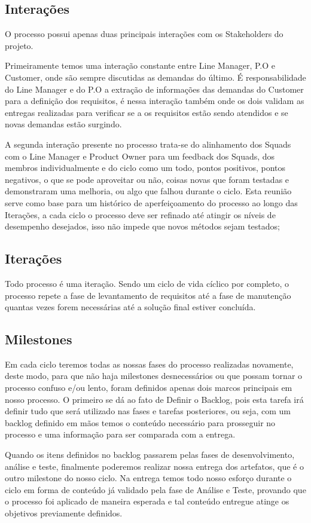 \documentclass[	DIV=calc,%
							paper=a4,%
							fontsize=12pt,%
							onecolumn]{scrartcl}	 					%
\begin{document}
\subsection{Interações}
O processo possui apenas duas principais interações com os Stakeholders do projeto. 

Primeiramente temos uma interação constante entre Line Manager, P.O e Customer, onde são sempre discutidas as demandas do último. É responsabilidade do Line Manager e do P.O a extração de informações das demandas do Customer para a definição dos requisitos, é nessa interação também onde os dois validam as entregas realizadas para verificar se a os requisitos estão sendo atendidos e se novas demandas estão surgindo. 

A segunda interação presente no processo trata-se do alinhamento dos Squads com o Line Manager e Product Owner para um feedback dos Squads, dos membros individualmente e do ciclo como um todo, pontos positivos, pontos negativos, o que se pode aproveitar ou não, coisas novas que foram testadas e demonstraram uma melhoria, ou algo que falhou durante o ciclo. Esta reunião serve como base para um histórico de aperfeiçoamento do processo ao longo das Iterações, a cada ciclo o processo deve ser refinado até atingir os níveis de desempenho desejados, isso não impede que novos métodos sejam testados; 
\subsection{Iterações}
Todo processo é uma iteração. Sendo um ciclo de vida cíclico por completo, o processo repete a fase de levantamento de requisitos até a fase de manutenção quantas vezes forem necessárias até a solução final estiver concluída.


\subsection{Milestones}
Em cada ciclo teremos todas as nossas fases do processo realizadas novamente, deste modo, para que não haja milestones desnecessários ou que possam tornar o processo confuso e/ou lento, foram definidos apenas dois marcos principais em nosso processo. O primeiro se dá ao fato de Definir o Backlog, pois esta tarefa irá definir tudo que será utilizado nas fases e tarefas posteriores, ou seja, com um backlog definido em mãos temos o conteúdo necessário para prosseguir no processo e uma informação para ser comparada com a entrega. 

Quando os itens definidos no backlog passarem pelas fases de desenvolvimento, análise e teste, finalmente poderemos realizar nossa entrega dos artefatos, que é o outro milestone do nosso ciclo. Na entrega temos todo nosso esforço durante o ciclo em forma de conteúdo já validado pela fase de Análise e Teste, provando que o processo foi aplicado de maneira esperada e tal conteúdo entregue atinge os objetivos previamente definidos.
\end{document}
